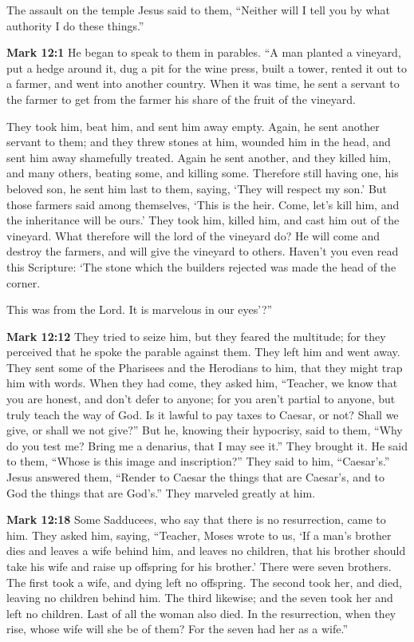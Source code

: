 \documentclass[10pt,twoside]{book}
\newcommand{\quotesize}{\normalsize{}}
\newenvironment{quotetext}{\begingroup\quotesize}{\endgroup}
\newcommand{\bible}[2]{\begin{quotetext}\textbf{#1} #2\end{quotetext}}
\newcommand{\gospelmark}[2]{\bible{Mark #1}{#2}}
\begin{document}
\begin{section}{The assault on the temple}
{Jesus said to them, ``Neither will I tell you by what authority I do these things.'' 
}

\gospelmark{12:1}{
   He began to speak to them in parables. ``A man planted a vineyard, put a hedge around it, dug a pit for the wine press, built a tower, rented it out to a farmer, and went into another country.    When it was time, he sent a servant to the farmer to get from the farmer his share of the fruit of the vineyard.   

 They took him, beat him, and sent him away empty.    Again, he sent another servant to them; and they threw stones at him, wounded him in the head, and sent him away shamefully treated.    Again he sent another, and they killed him, and many others, beating some, and killing some.    Therefore still having one, his beloved son, he sent him last to them, saying, `They will respect my son.'    But those farmers said among themselves, `This is the heir. Come, let's kill him, and the inheritance will be ours.'    They took him, killed him, and cast him out of the vineyard.    What therefore will the lord of the vineyard do? He will come and destroy the farmers, and will give the vineyard to others.    Haven't you even read this Scripture:
`The stone which the builders rejected
was made the head of the corner.

   This was from the Lord.
It is marvelous in our eyes'?''
}

\gospelmark{12:12}{
 They tried to seize him, but they feared the multitude; for they perceived that he spoke the parable against them. They left him and went away.   They sent some of the Pharisees and the Herodians to him, that they might trap him with words.   When they had come, they asked him, ``Teacher, we know that you are honest, and don't defer to anyone; for you aren't partial to anyone, but truly teach the way of God. Is it lawful to pay taxes to Caesar, or not?   Shall we give, or shall we not give?''
But he, knowing their hypocrisy, said to them, ``Why do you test me? Bring me a denarius, that I may see it.''
  They brought it.
He said to them, ``Whose is this image and inscription?''
They said to him, ``Caesar's.''
  Jesus answered them, ``Render to Caesar the things that are Caesar's, and to God the things that are God's.''
They marveled greatly at him. 
}

\gospelmark{12:18}{
Some Sadducees, who say that there is no resurrection, came to him. They asked him, saying,   ``Teacher, Moses wrote to us, `If a man's brother dies and leaves a wife behind him, and leaves no children, that his brother should take his wife and raise up offspring for his brother.'   There were seven brothers. The first took a wife, and dying left no offspring.   The second took her, and died, leaving no children behind him. The third likewise;   and the seven took her and left no children. Last of all the woman also died.   In the resurrection, when they rise, whose wife will she be of them? For the seven had her as a wife.''

}
\end{section}
\end{document}
